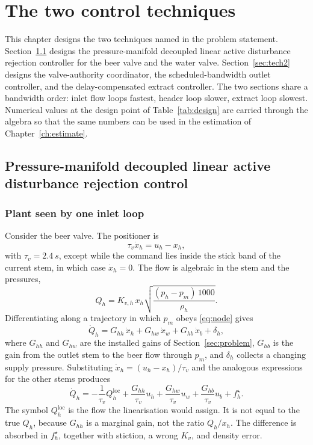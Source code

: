 \chapter{The two control techniques}
\label{ch:design}

This chapter designs the two techniques named in the problem statement. Section~\ref{sec:tech1} designs the pressure-manifold decoupled linear active disturbance rejection controller for the beer valve and the water valve. Section~\ref{sec:tech2} designs the valve-authority coordinator, the scheduled-bandwidth outlet controller, and the delay-compensated extract controller. The two sections share a bandwidth order: inlet flow loops fastest, header loop slower, extract loop slowest. Numerical values at the design point of Table~\ref{tab:design} are carried through the algebra so that the same numbers can be used in the estimation of Chapter~\ref{ch:estimate}.

\section{Pressure-manifold decoupled linear active disturbance rejection control}
\label{sec:tech1}

\subsection{Plant seen by one inlet loop}

Consider the beer valve. The positioner is
\begin{equation}
\label{eq:positioner}
\tau_v \dot{x}_h = u_h - x_h,
\end{equation}
with $\tau_v = \SI{2.4}{s}$, except while the command lies inside the stick band of the current stem, in which case $\dot{x}_h = 0$. The flow is algebraic in the stem and the pressures,
\begin{equation}
\label{eq:qh-alg}
Q_h = K_{v,h}\, x_h \sqrt{\frac{(p_h-p_m)\,1000}{\rho_h}}.
\end{equation}
Differentiating along a trajectory in which $p_m$ obeys \eqref{eq:node} gives
\begin{equation}
\label{eq:qdot}
\dot{Q}_h = G_{hh}\,\dot{x}_h + G_{hw}\,\dot{x}_w + G_{hb}\,\dot{x}_b + \delta_h,
\end{equation}
where $G_{hh}$ and $G_{hw}$ are the installed gains of Section~\ref{sec:problem}, $G_{hb}$ is the gain from the outlet stem to the beer flow through $p_m$, and $\delta_h$ collects a changing supply pressure. Substituting $\dot{x}_h = (u_h-x_h)/\tau_v$ and the analogous expressions for the other stems produces
\begin{equation}
\label{eq:qdot-u}
\dot{Q}_h = -\frac{1}{\tau_v}Q_h^{\mathrm{loc}} + \frac{G_{hh}}{\tau_v} u_h + \frac{G_{hw}}{\tau_v} u_w + \frac{G_{hb}}{\tau_v} u_b + f_h^\star.
\end{equation}
The symbol $Q_h^{\mathrm{loc}}$ is the flow the linearisation would assign. It is not equal to the true $Q_h$, because $G_{hh}$ is a marginal gain, not the ratio $Q_h/x_h$. The difference is absorbed in $f_h^\star$, together with stiction, a wrong $K_v$, and density error.

